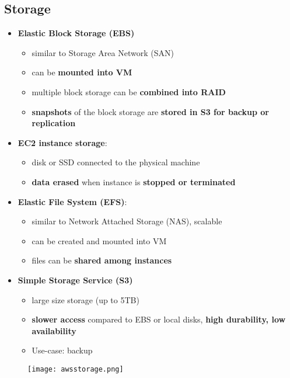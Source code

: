 \subsection{Storage}
\begin{itemize}
	\item \textbf{Elastic Block Storage (EBS)}
	\begin{itemize}
		\item similar to Storage Area Network (SAN)
		\item can be \textbf{mounted into VM}
		\item multiple block storage can be \textbf{combined into RAID}
		\item \textbf{snapshots} of the block storage are \textbf{stored in S3 for backup or replication}
	\end{itemize}
	\item \textbf{EC2 instance storage}: 
	\begin{itemize}
		\item disk or SSD connected to the physical machine
		\item \textbf{data erased} when instance is \textbf{stopped or terminated}
	\end{itemize}
	\item \textbf{Elastic File System (EFS)}: 
	\begin{itemize}
		\item similar to Network Attached Storage (NAS), scalable
		\item can be created and mounted into VM
		\item files can be \textbf{shared among instances}
	\end{itemize}
	\item \textbf{Simple Storage Service (S3)}
	\begin{itemize}
		\item large size storage (up to 5TB)
		\item \textbf{slower access} compared to EBS or local disks, \textbf{high durability, low availability}
		\item Use-case: backup
	\end{itemize}
\end{itemize}

\begin{figure}[H]
	\centering
	\texttt{[image: awsstorage.png]}
\end{figure}

